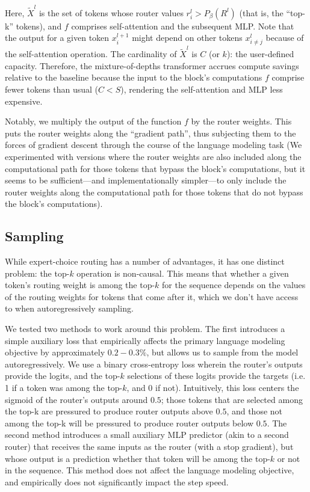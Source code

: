 \documentclass[11pt, a4paper, onecolumn, logo, copyright]{googledeepmind}
\begin{document}
Here, $\tilde{X}^l$ is the set of tokens whose router values $r_i^l > P_\beta(R^l)$ (that is, the ``top-k'' tokens), and $f$ comprises self-attention and the subsequent MLP. Note that the output for a given token $x_i^{l+1}$ might depend on other tokens $x_{i \neq j}^l$ because of the self-attention operation. The cardinality of $\tilde{X}^l$ is $C$ (or $k$): the user-defined capacity. Therefore, the mixture-of-depths transformer accrues compute savings relative to the baseline because the input to the block's computations $f$ comprise fewer tokens than usual ($C < S$), rendering the self-attention and MLP less expensive. 

Notably, we multiply the output of the function $f$ by the router weights. This puts the router weights along the ``gradient path'', thus subjecting them to the forces of gradient descent through the course of the language modeling task (We experimented with versions where the router weights are also included along the computational path for those tokens that bypass the block's computations, but it seems to be sufficient---and implementationally simpler---to only include the router weights along the computational path for those tokens that do not bypass the block's computations). 

\subsection{Sampling}
\label{sec:sampling}
While expert-choice routing has a number of advantages, it has one distinct problem: the top-$k$ operation is non-causal. This means that whether a given token's routing weight is among the top-$k$ for the sequence depends on the values of the routing weights for tokens that come after it, which we don't have access to when autoregressively sampling. 

We tested two methods to work around this problem. The first introduces a simple auxiliary loss that empirically affects the primary language modeling objective by approximately $0.2-0.3\%$, but allows us to sample from the model autoregressively. We  use a binary cross-entropy loss wherein the router's outputs provide the logits, and the top-$k$ selections of these logits provide the targets (i.e. 1 if a token was among the top-$k$, and 0 if not). Intuitively, this loss centers the sigmoid of the router's outputs around $0.5$; those tokens that are selected among the top-k are pressured to produce router outputs above $0.5$, and those not among the top-k will be pressured to produce router outputs below $0.5$. The second method introduces a small auxiliary MLP predictor (akin to a second router) that receives the same inputs as the router (with a stop gradient), but whose output is a prediction whether that token will be among the top-$k$ or not in the sequence. This method does not affect the language modeling objective, and empirically does not significantly impact the step speed.
\end{document}
